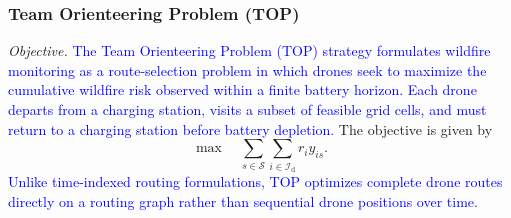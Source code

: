 \documentclass[pdflatex,sn-mathphys-num]{sn-jnl}%
\theoremstyle{thmstyleone}%
\theoremstyle{thmstyletwo}%
\theoremstyle{thmstylethree}%
\newcommand{\danique}[1]{\textcolor{magenta}{#1}}
\newcommand{\blue}[1]{\textcolor{blue}{#1}}
\begin{document}
\subsubsection*{Team Orienteering Problem (TOP)}

\noindent \textit{Objective.}
\blue{The Team Orienteering Problem (TOP) strategy formulates wildfire monitoring as a route-selection problem in which drones seek to maximize the cumulative wildfire risk observed within a finite battery horizon. Each drone departs from a charging station, visits a subset of feasible grid cells, and must return to a charging station before battery depletion.}  The objective is given by
\begin{equation}
\label{eq:top_obj}
\max \quad
\sum_{s \in \mathcal{S}}
\sum_{i \in \mathcal{I}_{\mathrm{d}}}
r_i y_{is}.
\end{equation}
\blue{Unlike time-indexed routing formulations, TOP optimizes complete drone routes directly on a routing graph rather than sequential drone positions over time.}\\
\\
\end{document}

